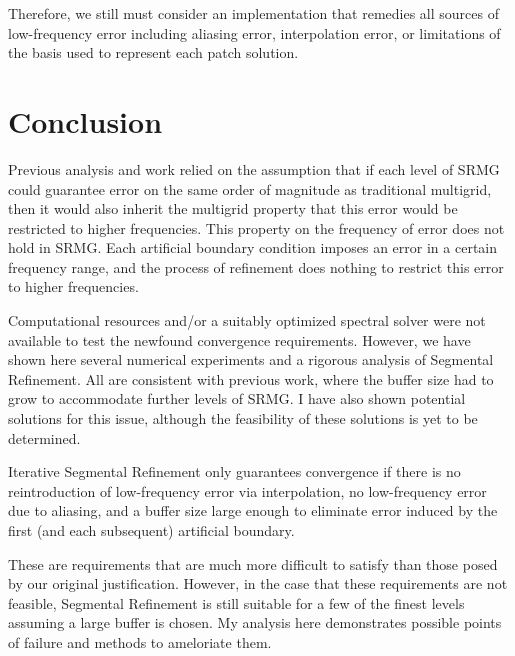 \documentclass[final]{siamart1116}
\numberwithin{theorem}{section}
\begin{document}
Therefore, we still must consider an implementation that remedies all sources of low-frequency error including aliasing error, interpolation error, or limitations of the basis used to represent each patch solution.


\section{Conclusion}\label{sec:conc}

Previous analysis and work relied on the assumption that if each level of SRMG could guarantee error on the same order of magnitude as traditional multigrid, then it would also inherit the multigrid property that this error would be restricted to higher frequencies. This property on the frequency of error does not hold in SRMG. Each artificial boundary condition imposes an error in a certain frequency range, and the process of refinement does nothing to restrict this error to higher frequencies. 

Computational resources and/or a suitably optimized spectral solver were not available to test the newfound convergence requirements. However, we have shown here several numerical experiments and a rigorous analysis of Segmental Refinement. All are consistent with previous work, where the buffer size had to grow to accommodate further levels of SRMG. I have also shown potential solutions for this issue, although the feasibility of these solutions is yet to be determined. 

Iterative Segmental Refinement only guarantees convergence if there is no reintroduction of low-frequency error via interpolation, no low-frequency error due to aliasing, and a buffer size large enough to eliminate error induced by the first (and each subsequent) artificial boundary.  

These are requirements that are much more difficult to satisfy than those posed by our original justification. However, in the case that these requirements are not feasible, Segmental Refinement is still suitable for a few of the finest levels assuming a large buffer is chosen. My analysis here demonstrates possible points of failure and methods to ameloriate them. 





\end{document}

